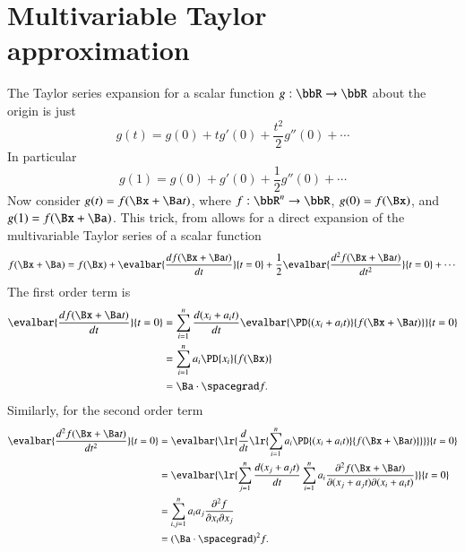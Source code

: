 %
%
\section{Multivariable Taylor approximation}

The Taylor series expansion for a scalar function \( g : \bbR \rightarrow \bbR \) about the origin is just
%
\begin{equation}\label{eqn:jacobianAndHessian:20}
g(t) = g(0) + t g'(0) + \frac{t^2}{2} g''(0) + \cdots
\end{equation}
%
In particular
%
\begin{equation}\label{eqn:jacobianAndHessian:40}
g(1) = g(0) + g'(0) + \frac{1}{2} g''(0) + \cdots
\end{equation}
%
Now consider \( g(t) = f( \Bx + \Ba t ) \), where \( f : \bbR^n \rightarrow \bbR \), \( g(0) = f(\Bx) \), and \( g(1) = f(\Bx + \Ba) \).
This trick, from
\citep{hestenes1999nfc}
allows for a direct expansion of the multivariable Taylor series of a scalar function
%
\begin{equation}\label{eqn:jacobianAndHessian:60}
f( \Bx + \Ba)
= f(\Bx)
+ \evalbar{\frac{df(\Bx + \Ba t)}{dt}}{t = 0} + \frac{1}{2} \evalbar{\frac{d^2f(\Bx + \Ba t)}{dt^2}}{t = 0} + \cdots
\end{equation}
%
The first order term is
%
\begin{equation}\label{eqn:jacobianAndHessian:80}
\begin{aligned}
\evalbar{\frac{df(\Bx + \Ba t)}{dt}}{t = 0}
&= \sum_{i = 1}^n \frac{d( x_i + a_i t)}{dt} \evalbar{\PD{(x_i + a_i t)}{f(\Bx + \Ba t)}}{t = 0} \\
&= \sum_{i = 1}^n a_i \PD{x_i}{f(\Bx)} \\
&= \Ba \cdot \spacegrad f.
\end{aligned}
\end{equation}
%
Similarly, for the second order term
%
\begin{equation}\label{eqn:jacobianAndHessian:100}
\begin{aligned}
\evalbar{\frac{d^2 f(\Bx + \Ba t)}{dt^2}}{t = 0}
&=
\evalbar{\lr{
   \frac{d}{dt}
   \lr{
   \sum_{i = 1}^n
   a_i
   \PD{(x_i + a_i t)}{f(\Bx + \Ba t)}
   }
   }
}{t = 0} \\
&=
\evalbar{
   \lr{
      \sum_{j = 1}^n
      \frac{d(x_j + a_j t)}{dt}
         \sum_{i = 1}^n
         a_i
      \frac{\partial^2 f(\Bx + \Ba t)}{\partial (x_j + a_j t) \partial (x_i + a_i t) }
   }
}{t = 0} \\
&=
\sum_{i,j = 1}^n a_i a_j \frac{\partial^2 f}{\partial x_i \partial x_j} \\
&=
(\Ba \cdot \spacegrad)^2 f.
\end{aligned}
\end{equation}
